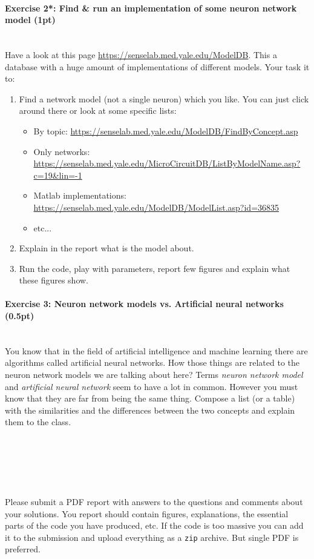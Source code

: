 \documentclass[a4paper,11pt]{article}
\newenvironment{exercise}[3]{\paragraph{Exercise #1: #2 (#3pt)}\ \\}{
\medskip}
\begin{document}
%
%
\begin{exercise}{2*}{Find \& run an implementation of some neuron network model}{1}
Have a look at this page \url{https://senselab.med.yale.edu/ModelDB}. This a database with a huge amount of implementations of different models. Your task it to:
\begin{enumerate}[label=\alph*)]
	\item Find a network model (not a single neuron) which you like. You can just click around there or look at some specific lists:
		\begin{itemize}
			\item By topic: \url{https://senselab.med.yale.edu/ModelDB/FindByConcept.asp}
			\item Only networks: \url{https://senselab.med.yale.edu/MicroCircuitDB/ListByModelName.asp?c=19&lin=-1}
			\item Matlab implementations: \url{https://senselab.med.yale.edu/ModelDB/ModelList.asp?id=36835}
			\item etc...
		\end{itemize}
	\item Explain in the report what is the model about.
	\item Run the code, play with parameters, report few figures and explain what these figures show.
\end{enumerate}
\end{exercise}


%
%
\begin{exercise}{3}{Neuron network models vs. Artificial neural networks}{0.5}
You know that in the field of artificial intelligence and machine learning there are algorithms called artificial neural networks. How those things are related to the neuron network models we are talking about here? Terms \emph{neuron network model} and \emph{artificial neural network} seem to have a lot in common. However you must know that they are far from being the same thing. Compose a list (or a table) with the similarities and the differences between the two concepts and explain them to the class.
\end{exercise}



\ \\
\ \\
\ \\
\ \\
\ \\
Please submit a PDF report with answers to the questions and comments about your solutions. You report should contain figures, explanations, the essential parts of the code you have produced, etc. If the code is too massive you can add it to the submission and upload everything as a \texttt{zip} archive. But single PDF is preferred.
\end{document}
